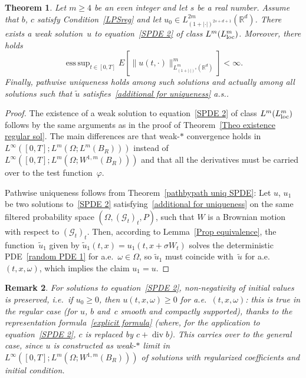 \documentclass[a4paper,10pt]{article}
\newtheorem{theorem}{Theorem}[section]
\newtheorem{remark}[theorem]{Remark}
\newcommand\1{\mathbbm{1}}
\newcommand{\mc}{\mathcal}
\newcommand{\td}{\tilde}
\newcommand\loc{{\rm loc}}
\DeclareMathOperator*{\esssup}{ess\,sup}
\DeclareMathOperator{\diverg}{div}
\numberwithin{equation}{section}
\begin{document}
\begin{theorem}\label{existence CE}
Let $m \geq 4$ be an even integer and let $s$ be a real number. Assume that $b$, $c$ satisfy Condition~\ref{LPSreg} and let $u_0 \in L^{2m}_{(1+|\cdot|)^{2s+d+1}}(\mathbb{R}^d)$. There exists a weak solution~$u$ to equation~\eqref{SPDE 2} of class $L^{m}(L^{m}_\loc)$. Moreover, there holds
\begin{equation*}
\esssup_{t\in[0,T]}E\left[\|u(t,\cdot)\|_{L^m_{(1+|\cdot|)^s}(\mathbb{R}^d)}^m\right] <\infty .
\end{equation*}
Finally, pathwise uniqueness holds among such solutions and actually among all solutions such that $\td{u}$ satisfies~\eqref{additional for uniqueness} a.s..
\end{theorem}

\begin{proof}
The existence of a weak solution to equation~\eqref{SPDE 2} of class $L^{m}(L^{m}_\loc)$ follows by the same arguments as in the proof of Theorem~\ref{Theo existence regular sol}. The main differences are that weak-$*$ convergence holds in $L^\infty([0,T];L^m(\Omega;L^m(B_R)))$ instead of $L^\infty([0,T];L^m(\Omega;W^{1,m}(B_R)))$ and that all the derivatives must be carried over to the test function~$\varphi$.

Pathwise uniqueness follows from Theorem~\ref{pathbypath uniq SPDE}: Let $u$, $u_1$ be two solutions to~\eqref{SPDE 2} satisfying~\eqref{additional for uniqueness} on the same filtered probability space $(\Omega,(\mc{G}_t)_t,P)$, such that $W$ is a Brownian motion with respect to $(\mc{G}_t)_t$. Then, according to Lemma~\ref{Prop equivalence}, the function~$\td{u}_1$ given by $\td{u}_1(t,x) =u_1(t,x+\sigma W_t)$ solves the deterministic PDE~\eqref{random PDE 1} for a.e.~$\omega \in \Omega$, so $\td{u}_1$ must coincide with~$\td{u}$ for a.e.~$(t,x,\omega)$, which implies the claim $u_1=u$. 
\end{proof}

\begin{remark}\label{positivity}
For solutions to equation~\eqref{SPDE 2}, non-negativity of initial values is preserved, i.e.~if $u_0\ge0$, then $u(t,x,\omega)\ge0$ for a.e.~$(t,x,\omega)$: this is true in the regular case \textup{(}for $u$, $b$ and~$c$ smooth and compactly supported\textup{)}, thanks to the representation formula~\eqref{explicit formula} \textup{(}where, for the application to equation~\eqref{SPDE 2}, $c$ is replaced by $c+ \diverg b$\textup{)}. This carries over to the general case, since $u$ is constructed as weak-$*$ limit in $L^\infty([0,T];L^m(\Omega;W^{1,m}(B_R)))$ of solutions with regularized coefficients and initial condition.
\end{remark}
\end{document}
